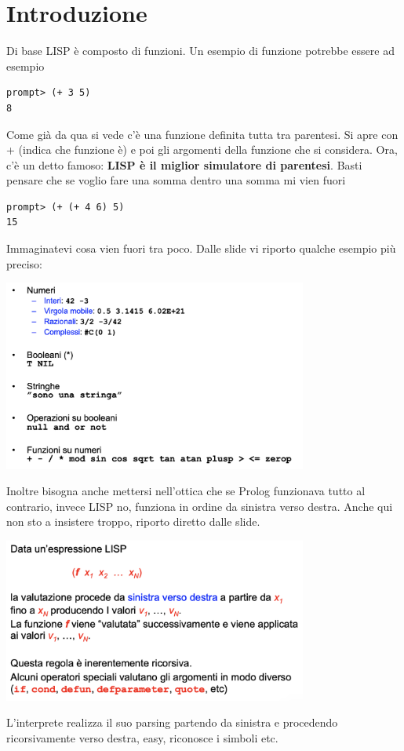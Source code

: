 \documentclass[12pt, a4paper, openany, oneside]{book}
\begin{document}
\section{Introduzione}
Di base LISP è composto di funzioni. Un esempio di funzione potrebbe
essere ad esempio
\begin{lstlisting}[language=LISP]
prompt> (+ 3 5)
8
\end{lstlisting}
Come già da qua si vede c'è una funzione definita tutta tra parentesi. Si apre 
con + (indica che funzione è) e poi gli argomenti della funzione che si considera.
Ora, c'è un detto famoso: \textbf{LISP è il miglior simulatore di parentesi}. 
Basti pensare che se voglio fare una somma dentro una somma mi vien fuori
\begin{lstlisting}[language=LISP]
prompt> (+ (+ 4 6) 5)
15
\end{lstlisting}
Immaginatevi cosa vien fuori tra poco.
Dalle slide vi riporto qualche esempio più preciso: 
\begin{center}
\includegraphics[width=0.75\textwidth]{12}
\end{center}
Inoltre bisogna anche mettersi nell'ottica che se Prolog funzionava tutto al 
contrario, invece LISP no, funziona in ordine da sinistra verso destra.
Anche qui non sto a insistere troppo, riporto diretto dalle slide.
\begin{center}
\includegraphics[width=0.75\textwidth]{13}
\end{center}
L'interprete realizza il suo parsing partendo da sinistra e procedendo 
ricorsivamente verso destra, easy, riconosce i simboli etc.
\end{document}
